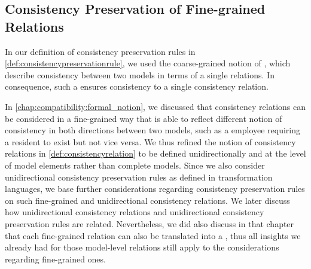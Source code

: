 

\subsection{Consistency Preservation of Fine-grained Relations}
\label{chap:synchronization:gap:finegrained}

In our definition of consistency preservation rules in \autoref{def:consistencypreservationrule}, we used the coarse-grained notion of \modellevelconsistencyrelations, which describe consistency between two models in terms of a single relations.
In consequence, such a \modellevelconsistencypreservationrule ensures consistency to a single consistency relation.

In \autoref{chap:compatibility:formal_notion}, we discussed that consistency relations can be considered in a fine-grained way that is able to reflect different notion of consistency in both directions between two models, such as a employee requiring a resident to exist but not vice versa.
We thus refined the notion of consistency relations in \autoref{def:consistencyrelation} to be defined unidirectionally and at the level of model elements rather than complete models.
Since we also consider unidirectional consistency preservation rules as defined in transformation languages, we base further considerations regarding consistency preservation rules on such fine-grained and unidirectional consistency relations.
We later discuss how unidirectional consistency relations and unidirectional consistency preservation rules are related.
Nevertheless, we did also discuss in that chapter that each fine-grained relation can also be translated into a \modellevelconsistencyrelation, thus all insights we already had for those model-level relations still apply to the considerations regarding fine-grained ones.

